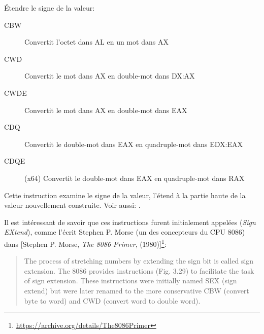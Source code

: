 \label{ins:CBW_CWD_etc}
\item[CBW/CWD/CWDE/CDQ/CDQE]

Étendre le signe de la valeur:

\begin{description}
\item[CBW] Convertit l'octet dans AL en un mot dans AX
\item[CWD] Convertit le mot dans AX en double-mot dans DX:AX
\item[CWDE] Convertit le mot dans AX en double-mot dans EAX
\item[CDQ] Convertit le double-mot dans EAX en quadruple-mot dans EDX:EAX
\item[CDQE] (x64) Convertit le double-mot dans EAX en quadruple-mot dans RAX
\end{description}

Cette instruction examine le signe de la valeur, l'étend à la partie haute de la
valeur nouvellement construite. Voir aussi: .

\newcommand{\StephenMorse}{[Stephen P. Morse, \emph{The 8086 Primer}, (1980)]\footnote{\AlsoAvailableAs \url{https://archive.org/details/The8086Primer}}}

Il est intéressant de savoir que ces instructions furent initialement appelées 
(\emph{Sign EXtend}), comme l'écrit Stephen P. Morse (un des concepteurs du CPU 8086)
dans \StephenMorse:

\begin{framed}
\begin{quotation}
The process of stretching numbers by extending the sign bit is called sign extension.
The 8086 provides instructions (Fig. 3.29) to facilitate the task of sign extension.
These instructions were initially named SEX (sign extend) but were later renamed to the more
conservative CBW (convert byte to word) and CWD (convert word to double word).
\end{quotation}
\end{framed}
